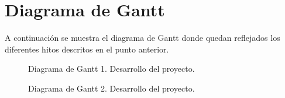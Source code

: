 \section{Diagrama de Gantt}

A continuación se muestra el diagrama de Gantt donde quedan reflejados los diferentes hitos descritos en el punto anterior.

\begin{figure}
  \caption{Diagrama de Gantt 1. Desarrollo del proyecto.}
\end{figure}

\begin{figure}
  \caption{Diagrama de Gantt 2. Desarrollo del proyecto.}
\end{figure}